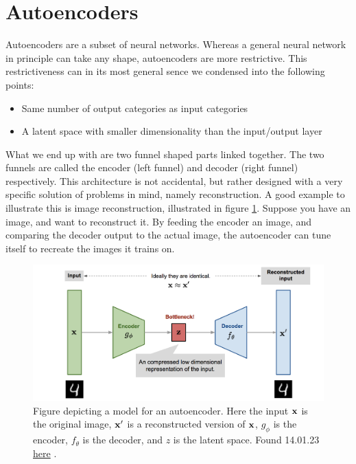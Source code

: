 \section{Autoencoders}\label{sec:autoencder_theory}
Autoencoders are a subset of neural networks. Whereas a general neural network
 in principle can take any shape, autoencoders are more restrictive.
This restrictiveness can in its most general sence we condensed 
into the following points:
\begin{itemize}
    \item Same number of output categories as input categories  
    \item A latent space with smaller dimensionality than the input/output layer  
\end{itemize}
What we end up with are two funnel shaped parts linked together. The two funnels are 
called the encoder (left funnel) and decoder (right funnel) respectively. This architecture is not 
accidental, but rather designed with a very specific solution of problems in mind, namely reconstruction. 
A good example to illustrate this is image reconstruction, illustrated in figure \ref{fig:ae_denoise}. 
Suppose you have an image, and want to reconstruct it. By feeding the encoder an image, 
and comparing the decoder output to the actual image, the autoencoder can tune itself to recreate the images it trains on. 

\begin{figure}[H]
    \includegraphics[width=\linewidth]{Figures/Machinelearning/autoencoder_imagedenoising.png}
    \caption[Conceptual autoencoder]{Figure depicting a model for an autoencoder. Here the input $\bf{x}$ is the original image, $\bf{x'}$ is a reconstructed version of $\bf{x}$, $g_{\phi}$ is the encoder, $f_{\theta}$ is the decoder, and $z$ is the latent space. Found 14.01.23 \href{https://lilianweng.github.io/posts/2018-08-12-vae/autoencoder-architecture.png}{here} \cite{weng2018VAE}. }
    \label{fig:ae_denoise}
\end{figure}

